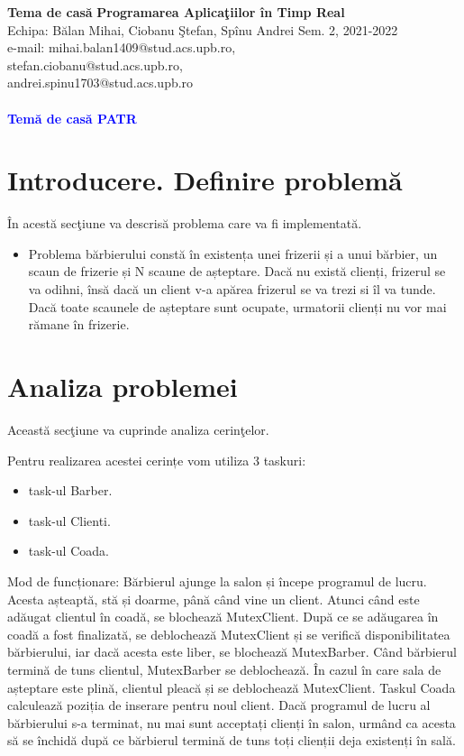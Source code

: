 \documentclass[a4paper, 11pt]{article}
\begin{document}

\noindent
\large\textbf{Tema de cas\u{a}} \hfill \textbf{Programarea Aplica\c{t}iilor \^{i}n Timp Real} \\
\normalsize Echipa: B\u{a}lan Mihai, Ciobanu \c{S}tefan, Sp\^{i}nu Andrei  \hfill Sem. 2, 2021-2022 \\ 
\normalsize e-mail: mihai.balan1409@stud.acs.upb.ro,\\ stefan.ciobanu@stud.acs.upb.ro,\\ andrei.spinu1703@stud.acs.upb.ro  \\
\\
\large\textbf{\textcolor{blue}{Tem\u{a} de cas\u{a} PATR}}


\section{Introducere. Definire problem\u{a}}

\^{I}n acest\u{a} sec\c{t}iune va descris\u{a} problema care va fi implementat\u{a}.

\begin{itemize}
\item Problema bărbierului constă în existența unei frizerii și a unui bărbier, un scaun de frizerie și N scaune  de așteptare.
Dacă nu există clienți, frizerul se va odihni, însă dacă un client v-a apărea frizerul se va trezi si îl va tunde. Dacă toate scaunele de așteptare sunt ocupate, urmatorii clienți nu vor mai rămane în frizerie.
\end{itemize}

\section{Analiza problemei}

Aceast\u{a} sec\c{t}iune va cuprinde analiza cerin\c{t}elor.

Pentru realizarea acestei cerințe vom utiliza 3 taskuri:

\begin{itemize}
\item task-ul Barber.
\item task-ul Clienti.
\item task-ul Coada.
\end{itemize}


Mod de funcționare:
Bărbierul ajunge la salon și începe programul de lucru. Acesta așteaptă, stă și doarme, până când vine un client. Atunci când este adăugat clientul în coadă, se blochează MutexClient. După ce se adăugarea în coadă a fost finalizată, se deblochează MutexClient și se verifică disponibilitatea bărbierului, iar dacă acesta este liber, se blochează MutexBarber. Când bărbierul termină de tuns clientul, MutexBarber se deblochează. În cazul în care sala de așteptare este plină, clientul pleacă și se deblochează MutexClient. Taskul Coada calculează poziția de inserare pentru noul client. Dacă programul de lucru al bărbierului s-a terminat, nu mai sunt acceptați clienți în salon, urmând ca acesta să se închidă după ce bărbierul termină de tuns toți clienții deja existenți în sală.
\end{document}
